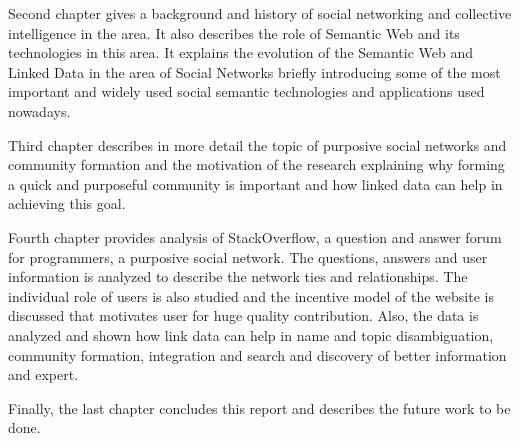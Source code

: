 Second chapter gives a background and history of social networking and collective intelligence in the area. It also describes the role of Semantic Web and its technologies in this area. It explains the evolution of the Semantic Web and Linked Data in the area of Social Networks briefly introducing some of the most important and widely used social semantic technologies and applications used nowadays.

Third chapter describes in more detail the topic of purposive social networks and community formation and the motivation of the research explaining why forming a quick and purposeful community is important and how linked data can help in achieving this goal.

Fourth chapter provides analysis of StackOverflow, a question and answer forum for programmers, a purposive social network.  The questions, answers and user information is analyzed to describe the network ties and relationships. The individual role of users is also studied and the incentive model of the website is discussed that motivates user for huge quality contribution. Also, the data is analyzed and shown how link data can help in name and topic disambiguation,  community formation, integration and search and discovery of better information and expert.

Finally, the last chapter concludes this report and describes the future work to be done.